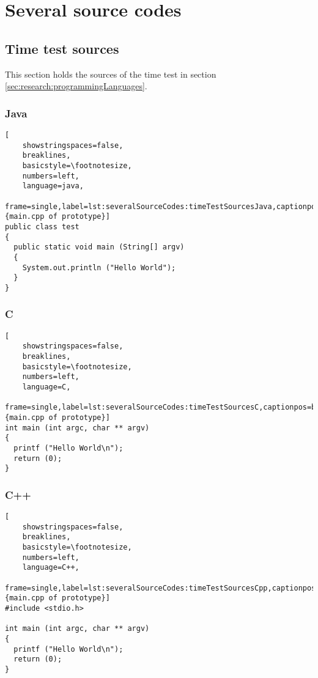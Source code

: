 \chapter{Several source codes}
\label{app:severalSourceCodes}

 \section{Time test sources}
 \label{app:severalSourceCodes:timeTestSources}
 This section holds the sources of the time test in section \ref{sec:research:programmingLanguages}.
  \subsection{Java}
   \singlespacing
   \begin{lstlisting}[
	showstringspaces=false,
	breaklines,
	basicstyle=\footnotesize,
	numbers=left,
	language=java,
	frame=single,label=lst:severalSourceCodes:timeTestSourcesJava,captionpos=b,caption={main.cpp of prototype}]
public class test
{
  public static void main (String[] argv)
  {
    System.out.println ("Hello World");
  }
}
   \end{lstlisting}
   \onehalfspacing

  \subsection{C}
   \singlespacing
   \begin{lstlisting}[
	showstringspaces=false,
	breaklines,
	basicstyle=\footnotesize,
	numbers=left,
	language=C,
	frame=single,label=lst:severalSourceCodes:timeTestSourcesC,captionpos=b,caption={main.cpp of prototype}]
int main (int argc, char ** argv)
{
  printf ("Hello World\n");
  return (0);
}
   \end{lstlisting}
   \onehalfspacing

  \subsection{C++}
   \singlespacing
   \begin{lstlisting}[
	showstringspaces=false,
	breaklines,
	basicstyle=\footnotesize,
	numbers=left,
	language=C++,
	frame=single,label=lst:severalSourceCodes:timeTestSourcesCpp,captionpos=b,caption={main.cpp of prototype}]
#include <stdio.h>

int main (int argc, char ** argv)
{
  printf ("Hello World\n");
  return (0);
}
   \end{lstlisting}
   \onehalfspacing
